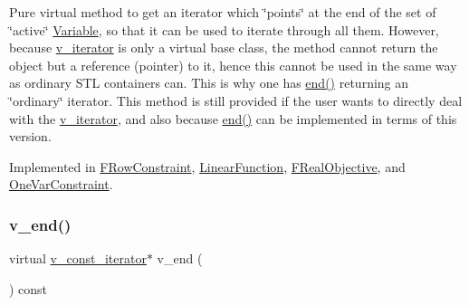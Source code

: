 Pure virtual method to get an iterator which \char`\"{}points\char`\"{} at the end of the set of \char`\"{}active\char`\"{} \mbox{\hyperlink{class_s_m_spp__di__unipi__it_1_1_variable}{Variable}}, so that it can be used to iterate through all them. However, because \mbox{\hyperlink{class_s_m_spp__di__unipi__it_1_1_thin_var_dep_interface_1_1v__iterator}{v\+\_\+iterator}} is only a virtual base class, the method cannot return the object but a reference (pointer) to it, hence this cannot be used in the same way as ordinary S\+TL containers can. This is why one has \mbox{\hyperlink{group___thin_var_dep_interface___c_l_a_s_s_e_s_gae1175d5cbc6627e3e49ed9bcb58ffce9}{end()}} returning an \char`\"{}ordinary\char`\"{} iterator. This method is still provided if the user wants to directly deal with the \mbox{\hyperlink{class_s_m_spp__di__unipi__it_1_1_thin_var_dep_interface_1_1v__iterator}{v\+\_\+iterator}}, and also because \mbox{\hyperlink{group___thin_var_dep_interface___c_l_a_s_s_e_s_gae1175d5cbc6627e3e49ed9bcb58ffce9}{end()}} can be implemented in terms of this version. 

Implemented in \mbox{\hyperlink{class_s_m_spp__di__unipi__it_1_1_f_row_constraint_ad17303c6335cb94a9d32f1fce77501fd}{F\+Row\+Constraint}}, \mbox{\hyperlink{class_s_m_spp__di__unipi__it_1_1_linear_function_a84a680d911c65c059b67cfeb63815e29}{Linear\+Function}}, \mbox{\hyperlink{class_s_m_spp__di__unipi__it_1_1_f_real_objective_ad17303c6335cb94a9d32f1fce77501fd}{F\+Real\+Objective}}, and \mbox{\hyperlink{class_s_m_spp__di__unipi__it_1_1_one_var_constraint_ad17303c6335cb94a9d32f1fce77501fd}{One\+Var\+Constraint}}.

\mbox{\label{group___thin_var_dep_interface___c_l_a_s_s_e_s_ga6c504e866663eb64b230179f81370af4}} 
\subsubsection{\texorpdfstring{v\+\_\+end()}{v\_end()}\hspace{0.1cm}{\footnotesize\ttfamily [2/2]}}
{\footnotesize\ttfamily virtual \mbox{\hyperlink{class_s_m_spp__di__unipi__it_1_1_thin_var_dep_interface_1_1v__const__iterator}{v\+\_\+const\+\_\+iterator}}$\ast$ v\+\_\+end (\begin{DoxyParamCaption}\item[{void}]{ }\end{DoxyParamCaption}) const\hspace{0.3cm}{\ttfamily [pure virtual]}}



